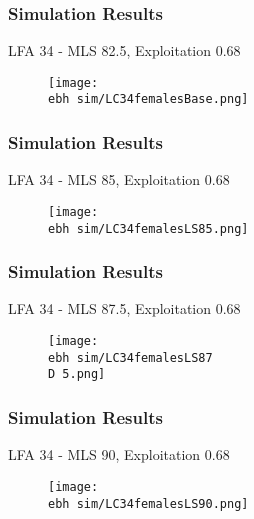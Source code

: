 \documentclass{beamer}
\newcommand{\ebh}{\string~/bio.data/bio.lobster/figures/LFA3438Framework2019/} %
\newcommand{\D}{.}
\begin{document}

\begin{frame}
\frametitle{Simulation Results}
LFA 34 - MLS 82.5, Exploitation 0.68
\begin{figure}
        \begin{center}
            \texttt{[image: \\ebh sim/LC34femalesBase.png]}
        \end{center}
    \end{figure}
\end{frame}



\begin{frame}
\frametitle{Simulation Results}
LFA 34 - MLS 85, Exploitation 0.68
\begin{figure}
        \begin{center}
            \texttt{[image: \\ebh sim/LC34femalesLS85.png]}
        \end{center}
    \end{figure}
\end{frame}


\begin{frame}
\frametitle{Simulation Results}
LFA 34 - MLS 87.5, Exploitation 0.68
\begin{figure}
        \begin{center}
            \texttt{[image: \\ebh sim/LC34femalesLS87\\D 5.png]}
        \end{center}
    \end{figure}
\end{frame}


\begin{frame}
\frametitle{Simulation Results}
LFA 34 - MLS 90, Exploitation 0.68
\begin{figure}
        \begin{center}
            \texttt{[image: \\ebh sim/LC34femalesLS90.png]}
        \end{center}
    \end{figure}
\end{frame}



\end{document}
